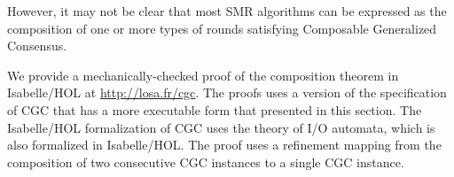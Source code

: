 \documentclass{llncs}
\begin{document}
However, it may not be clear that most SMR algorithms can be expressed as the composition of one or more types of rounds satisfying Composable Generalized Consensus.

We provide a mechanically-checked proof of the composition theorem in Isabelle/HOL at \url{http://losa.fr/cgc}.
The proofs uses a version of the specification of CGC that has a more
executable form that presented in this section. 
The Isabelle/HOL formalization of CGC uses the theory of I/O automata, which
is also formalized in Isabelle/HOL\@. The proof uses a refinement
mapping from the composition of two consecutive CGC instances to a single CGC
instance.

\begin{comment}
\begin{theorem}[Composition Theorem]
    \label{thm:comp}
    In every execution of a succession of CGC instances, the history of valuations
    of the variable $proposed$ and, for every learner $l$, of the variables
    $learned\left[ l \right]$ satisfies Generalized Consensus.
\end{theorem}
\Cref{thm:comp} can be shown by induction on the number of rounds,
using the following lemma.
\begin{lem}
  \label{lem:comp}
    Consider two rounds numbered $i$ and $i+1$. In every execution of a
    succession of CGC instances, the history of valuations of the variables $inits
    = inits_i$, $propose = proposed_i \cup propose_{i+1}$, for every learner
    $l$, $learned\left[ l \right] = learned_i\left[ l \right] \cup
    learned_{i+1}\left[ l \right]$and $aborts = aborts_{i+1}$ satisfies CGC.
\end{lem}
\begin{proof}
  A mechanically-checked proof in Isabelle/HOL appears in \cref{sec:isaproofs}.
  The proofs uses a version of the specification of CGC that has a more
  executable form that presented in this section. Moreover,
  instead of history of commands, the Isabelle/HOL specification uses the more
  general notion of command history, presented in the next subsection.
  The Isabelle/HOL formalization of CGC uses the theory of I/O automata, which
  is also formalized in the Isabelle/HOL\@. The proof uses a refinement
  mapping from the composition of two consecutive CGC instances to a single CGC
  instance.
\end{proof}

\Cref{thm:comp} guarantees that the successive composition of any
number of CGC instances implements Generalized Consensus.
Therefore, with CGC, one can easily build replicated services that
dynamically adapt to the current operating conditions of the system: a
replicated service has several types of rounds at its disposal, each being
tailored to particular conditions. Each time the conditions change,
the current CGC instance aborts and passes the baton to a more 
appropriate type of round, as determined by the scheduling policy. Moreover, a new type
of CGC instance can always be devised after the system is deployed and added on the fly to
the existing types of rounds.


\end{comment}
\end{document}
